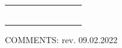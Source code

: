 \documentclass{sop_class}[overrideChapters] %
\begin{document}
{\begin{landscape}
\begin{table}[!htbp]
\begin{threeparttable}
\begin{tabular}{|c|c|c|c|c|c|c|c|c|}
            \hline
            {} & {} & {} & {} & {} & {} & {} & {} & {}\\
            \hline
            {} & {} & {} & {} & {} & {} & {} & {} & {}\\
            \hline
            {} & {} & {} & {} & {} & {} & {} & {} & {}\\
            \hline
            {} & {} & {} & {} & {} & {} & {} & {} & {}\\
            \hline
            {} & {} & {} & {} & {} & {} & {} & {} & {}\\
            \hline
            {} & {} & {} & {} & {} & {} & {} & {} & {}\\
            \hline
            {} & {} & {} & {} & {} & {} & {} & {} & {}\\
            \hline
            \bottomrule
            \end{tabular}
        \begin{tablenotes}
            \small
            \item COMMENTS: \hfill{} rev. 09.02.2022 \\
            \\
            \\
            \\
        \end{tablenotes}
    \end{threeparttable}
\end{table}
 \end{landscape}
\clearpage
\newpage
\begin{landscape} %

\end{landscape}}
\end{document}
